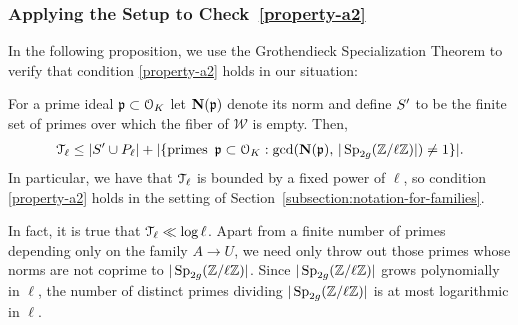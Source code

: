 \subsubsection{Applying the Setup to Check~\ref{property-a2}}
In the following proposition, we use the Grothendieck Specialization Theorem to verify that condition \ref{property-a2} holds in our situation:
	\begin{proposition}	\label{proposition:check-B}
For a prime ideal $\mathfrak p \subset \mathcal O_K$ let $\mathbf{N}(\mathfrak p)$ denote its norm and define $S'$ to be the finite set of primes over which the fiber of $\mathcal W$ is empty. Then,
 		\begin{align*}
			\mathcal T_{\ell} \leq |S' \cup P_\ell| + |\{\mathrm{primes}\,\,\, \mathfrak p \subset \mathcal O_K : \gcd(\mathbf{N}(\mathfrak p),\, | \operatorname{Sp}_{2g}(\mathbb Z/ \ell \mathbb Z)|) \neq 1 \}|.
		\end{align*}
		In particular, we have that $\mathcal T_{\ell}$ is bounded by a fixed power of $\ell$, so condition \ref{property-a2} holds in the setting of Section~\ref{subsection:notation-for-families}.
	\end{proposition}
\begin{remark}
	\label{remark:}
	In fact, it is true that $\mathcal T_{\ell} \ll \log \ell$. Apart from a finite number of primes depending only on the family $A \rightarrow U$, we need only throw out those primes whose norms are not coprime to $|\operatorname{Sp}_{2g}(\mathbb Z/ \ell \mathbb Z)|$. Since $|\operatorname{Sp}_{2g}(\mathbb Z/ \ell \mathbb Z)|$ grows polynomially in $\ell$,
	the number of distinct primes dividing $|\operatorname{Sp}_{2g}(\mathbb Z/ \ell \mathbb Z)|$
	is at most logarithmic in $\ell$.
\end{remark}
